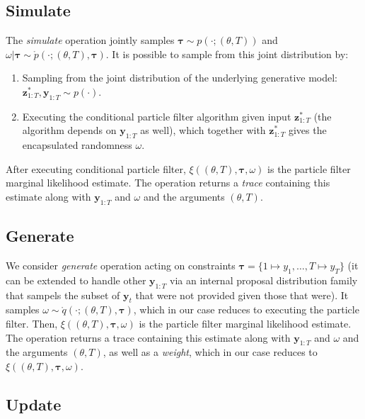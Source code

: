 \documentclass[11pt]{article}
\newcommand{\z}{\mathbf{z}}
\newcommand{\y}{\mathbf{y}}
\newcommand\tdict[0]{\boldsymbol{\tau}}
\begin{document}
\subsection{Simulate}
The \emph{simulate} operation jointly samples $\tdict \sim p(\cdot; (\theta, T))$ and $\omega | \tdict \sim \mathring{p}(\cdot; (\theta, T), \tdict)$.
It is possible to sample from this joint distribution by:
\begin{enumerate}
\item Sampling from the joint distribution of the underlying generative model: $\z_{1:T}^*, \y_{1:T} \sim p(\cdot)$.
\item Executing the conditional particle filter algorithm given input $\z_{1:T}^*$ (the algorithm depends on $\y_{1:T}$ as well), which together with $\z_{1:T}^*$ gives the encapsulated randomness $\omega$.
\end{enumerate}
After executing conditional particle filter, $\xi((\theta, T), \tdict, \omega)$ is the particle filter marginal likelihood estimate.
The operation returns a \emph{trace} containing this estimate along with $\y_{1:T}$ and $\omega$ and the arguments $(\theta, T)$.

\subsection{Generate}
We consider \emph{generate} operation acting on constraints $\tdict = \{1 \mapsto y_1, \ldots, T \mapsto y_T\}$ (it can be extended to handle other $\y_{1:T}$ via an internal proposal distribution family that sampels the subset of $\y_t$ that were not provided given those that were).
It samples $\omega \sim \mathring{q}(\cdot; (\theta, T), \tdict)$, which in our case reduces to executing the particle filter.
Then, $\xi((\theta, T), \tdict, \omega)$ is the particle filter marginal likelihood estimate.
The operation returns a trace containing this estimate along with $\y_{1:T}$ and $\omega$ and the arguments $(\theta, T)$, as well as a \emph{weight}, which in our case reduces to $\xi((\theta, T), \tdict, \omega)$.

\subsection{Update}
\end{document}
